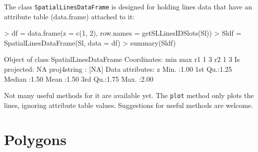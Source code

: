 \documentclass{article}
\begin{document}
The class {\tt SpatialLinesDataFrame} is designed for holding
lines data that have an attribute table (data.frame) attached
to it:
\begin{Schunk}
\begin{Sinput}
> df = data.frame(z = c(1, 2), row.names = getSLLinesIDSlots(Sl))
> Sldf = SpatialLinesDataFrame(Sl, data = df)
> summary(Sldf)
\end{Sinput}
\begin{Soutput}
Object of class SpatialLinesDataFrame
Coordinates:
   min max
r1   1   3
r2   1   3
Is projected: NA 
proj4string : [NA]
Data attributes:
       z       
 Min.   :1.00  
 1st Qu.:1.25  
 Median :1.50  
 Mean   :1.50  
 3rd Qu.:1.75  
 Max.   :2.00  
\end{Soutput}
\end{Schunk}
Not many useful methods for it are available yet.  The {\tt plot} method
only plots the lines, ignoring attribute table values. Suggestions for
useful methods are welcome.

\section{Polygons}
\end{document}
